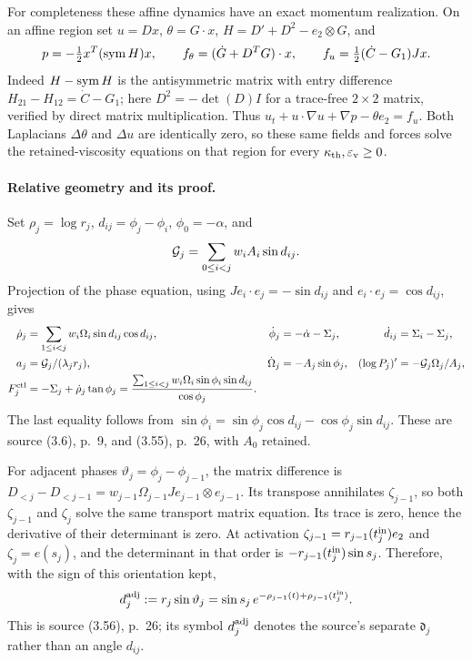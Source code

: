 For completeness these affine dynamics have an exact momentum realization. On an affine region set $u=Dx$, $\theta=G\cdot x$, $H=D'+D^2-e_2\otimes G$, and
\[
 p=-\tfrac12 x^T(\operatorname{sym} H)x,\qquad
 f_\theta=(\dot G+D^TG)\cdot x,\qquad
 f_u=\tfrac12(\dot C-G_1)Jx.
\]
Indeed $H-\operatorname{sym} H$ is the antisymmetric matrix with entry difference $H_{21}-H_{12}=\dot C-G_1$; here $D^2=-\det(D)I$ for a trace-free $2\times2$ matrix, verified by direct matrix multiplication. Thus $u_t+u\cdot\nabla u+\nabla p-\theta e_2=f_u$. Both Laplacians $\Delta\theta$ and $\Delta u$ are identically zero, so these same fields and forces solve the retained-viscosity equations on that region for every $\kappa_{\mathrm{th}},\varepsilon_{\mathrm v}\ge0$.

\paragraph{Relative geometry and its proof.}
Set $\rho_j=\log r_j$, $d_{ij}=\phi_j-\phi_i$, $\phi_0=-\alpha$, and
\[
 \mathcal G_j=\sum_{0\le i<j}w_iA_i\sin d_{ij}.
\]
Projection of the phase equation, using $Je_i\cdot e_j=-\sin d_{ij}$ and $e_i\cdot e_j=\cos d_{ij}$, gives
\begin{align}
 \dot\rho_j&=\sum_{1\le i<j}w_i\Omega_i\sin d_{ij}\cos d_{ij},&
 \dot\phi_j&=-\dot\alpha-\Sigma_j,&\dot d_{ij}&=\Sigma_i-\Sigma_j,\label{pc:eq:polar}\\
 a_j&=\mathcal G_j/(\lambda_jr_j),&\dot\Omega_j&=-A_j\sin\phi_j,&
 (\log P_j)'&=-\mathcal G_j\Omega_j/A_j,\nonumber\\
 F_j^{\rm ctl}&=-\Sigma_j+\dot\rho_j\tan\phi_j
 =\frac{\sum_{1\le i<j}w_i\Omega_i\sin\phi_i\sin d_{ij}}{\cos\phi_j}.\nonumber
\end{align}
The last equality follows from $\sin\phi_i=\sin\phi_j\cos d_{ij}-\cos\phi_j\sin d_{ij}$. These are source (3.6), p.~9, and (3.55), p.~26, with $A_0$ retained.

For adjacent phases $\vartheta_j=\phi_j-\phi_{j-1}$, the matrix difference is $D_{<j}-D_{<j-1}=w_{j-1}\Omega_{j-1}Je_{j-1}\otimes e_{j-1}$. Its transpose annihilates $\zeta_{j-1}$, so both $\zeta_{j-1}$ and $\zeta_j$ solve the same transport matrix equation. Its trace is zero, hence the derivative of their determinant is zero. At activation $\zeta_{j-1}=r_{j-1}(t_j^{\rm in})e_2$ and $\zeta_j=e(s_j)$, and the determinant in that order is $-r_{j-1}(t_j^{\rm in})\sin s_j$. Therefore, with the sign of this orientation kept,
\begin{equation}\label{pc:eq:determinant}
 d_j^{\rm adj}:=r_j\sin\vartheta_j
 =\sin s_j\,e^{-\rho_{j-1}(t)+\rho_{j-1}(t_j^{\rm in})}.
\end{equation}
This is source (3.56), p.~26; its symbol $d_j^{\rm adj}$ denotes the source's separate $\mathfrak d_j$ rather than an angle $d_{ij}$.

